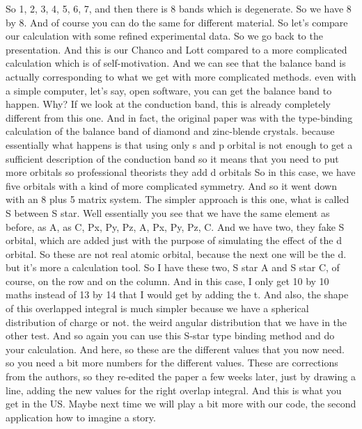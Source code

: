 So 1, 2, 3, 4, 5, 6, 7, and then there is 8 bands which is degenerate. So we have 8 by 8. And of course you can do the same for different material. So let's compare our calculation with some refined experimental data. So we go back to the presentation. And this is our Chanco and Lott compared to a more complicated calculation which is of self-motivation. And we can see that the balance band is actually corresponding to what we get with more complicated methods. even with a simple computer, let's say, open software, you can get the balance band to happen. Why? If we look at the conduction band, this is already completely different from this one. And in fact, the original paper was with the type-binding calculation of the balance band of diamond and zinc-blende crystals. because essentially what happens is that using only s and p orbital is not enough to get a sufficient description of the conduction band so it means that you need to put more orbitals so professional theorists they add d orbitals So in this case, we have five orbitals with a kind of more complicated symmetry. And so it went down with an 8 plus 5 matrix system.
The simpler approach is this one, what is called S between S star. Well essentially you see that we have the same element as before, as A, as C, Px, Py, Pz, A, Px, Py, Pz, C. And we have two, they fake S orbital, which are added just with the purpose of simulating the effect of the d orbital. So these are not real atomic orbital, because the next one will be the d. but it's more a calculation tool. So I have these two, S star A and S star C, of course, on the row and on the column. And in this case, I only get 10 by 10 maths instead of 13 by 14 that I would get by adding the t. And also, the shape of this overlapped integral is much simpler because we have a spherical distribution of charge or not. the weird angular distribution that we have in the other test. And so again you can use this S-star type binding method and do your calculation. And here, so these are the different values that you now need. so you need a bit more numbers for the different values. These are corrections from the authors, so they re-edited the paper a few weeks later, just by drawing a line, adding the new values for the right overlap integral. And this is what you get in the US. Maybe next time we will play a bit more with our code, the second application how to imagine a story.
